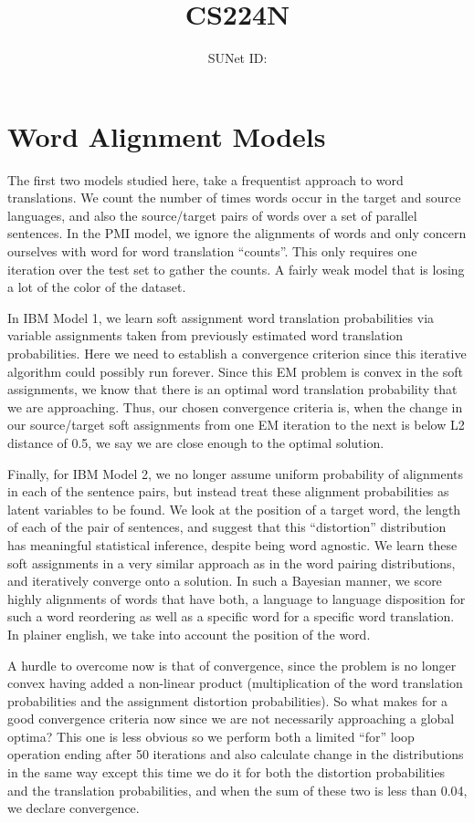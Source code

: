 \documentclass{article}
\title{CS224N \assignment}
\author{\studentname \qquad SUNet ID: \suid}
\begin{document}
\maketitle

\section*{Word Alignment Models}

The first two models studied here, take a frequentist approach to word translations. We count the number of times words occur in the target and source languages, and also the source/target pairs of words over a set of parallel sentences. In the PMI model, we ignore the alignments of words and only concern ourselves with word for word translation “counts”. This only requires one iteration over the test set to gather the counts. A fairly weak model that is losing a lot of the color of the dataset.

In IBM Model 1, we learn soft assignment word translation probabilities via variable assignments taken from previously estimated word translation probabilities. Here we need to establish a convergence criterion since this iterative algorithm could possibly run forever. Since this EM problem is convex in the soft assignments, we know that there is an optimal word translation probability that we are approaching. Thus, our chosen convergence criteria is, when the change in our source/target soft assignments from one EM iteration to the next is below L2 distance of 0.5, we say we are close enough to the optimal solution. 

Finally, for IBM Model 2, we no longer assume uniform probability of alignments in each of the sentence pairs, but instead treat these alignment probabilities as latent variables to be found. We look at the position of a target word, the length of each of the pair of sentences, and suggest that this “distortion” distribution has meaningful statistical inference, despite being word agnostic. We learn these soft assignments in a very similar approach as in the word pairing distributions, and iteratively converge onto a solution. In such a Bayesian manner, we score highly alignments of words that have both, a language to language disposition for such a word reordering as well as a specific word for a specific word translation. In plainer english, we take into account the position of the word. 

A hurdle to overcome now is that of convergence, since the problem is no longer convex having added a non-linear product (multiplication of the word translation probabilities and the assignment distortion probabilities). So what makes for a good convergence criteria now since we are not necessarily approaching a global optima? This one is less obvious so we perform both a limited “for” loop operation ending after 50 iterations and also calculate change in the distributions in the same way except this time we do it for both the distortion probabilities and the translation probabilities, and when the sum of these two is less than 0.04, we declare convergence.
\end{document}
